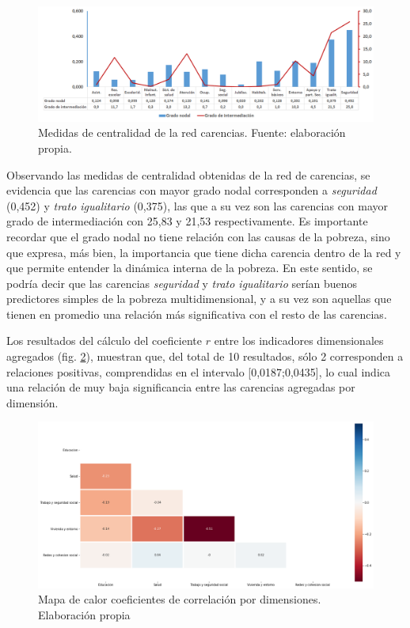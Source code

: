 \documentclass[12pt,letterpaper,spanish]{article}
\begin{document}
\begin{figure}[H]
    \centering
        \includegraphics[width=\textwidth]{Grafos/nc_general.png}
    \caption{Medidas de centralidad de la red carencias. Fuente: elaboración propia.}
    \label{analisisPos}
\end{figure}

Observando las medidas de centralidad obtenidas de la red de carencias, se evidencia que las carencias con mayor grado nodal corresponden a \textit{seguridad} (0,452) y \textit{trato igualitario} (0,375), las que a su vez son las carencias con mayor grado de intermediación con 25,83 y 21,53 respectivamente. Es importante recordar que el grado nodal no tiene relación con las causas de la pobreza, sino que expresa, más bien, la importancia que tiene dicha carencia dentro de la red y que permite entender la dinámica interna de la pobreza. En este sentido, se podría decir que las carencias \textit{seguridad} y \textit{trato igualitario} serían buenos predictores simples de la pobreza multidimensional, y a su vez son aquellas que tienen en promedio una relación más significativa con el resto de las carencias. 


Los resultados del cálculo del coeficiente $r$ entre los indicadores dimensionales agregados (fig. \ref{PearsonDim}), muestran que, del total de 10 resultados, sólo 2 corresponden a relaciones positivas, comprendidas en el intervalo [0,0187;0,0435], lo cual indica una relación de muy baja significancia entre las carencias agregadas por dimensión.

\begin{figure}[H]
    \centering
        \includegraphics[width=\linewidth]{Heatmaps/Heatmap_pearson_DIM.png}
    \caption{Mapa de calor coeficientes de correlación por dimensiones. Elaboración propia}
    \label{PearsonDim}
\end{figure}
\end{document}
